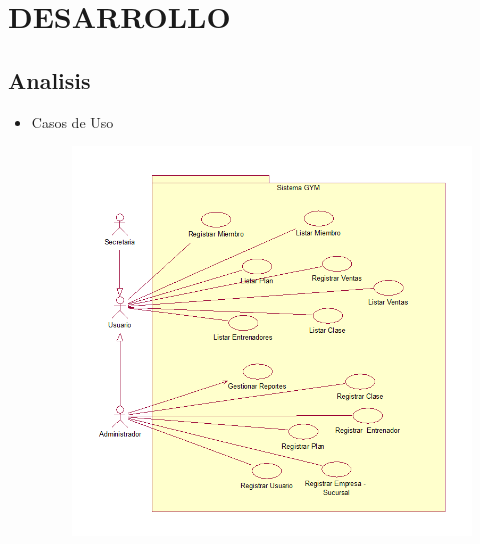 \section{DESARROLLO} 

\subsection{Analisis}
\begin{itemize}
	\item Casos de Uso
	\begin{figure}[H]
		\begin{center}
			\includegraphics[width=15cm]{./Imagenes/CasosDeUso}
		\end{center}
	\end{figure}
\end{itemize}


